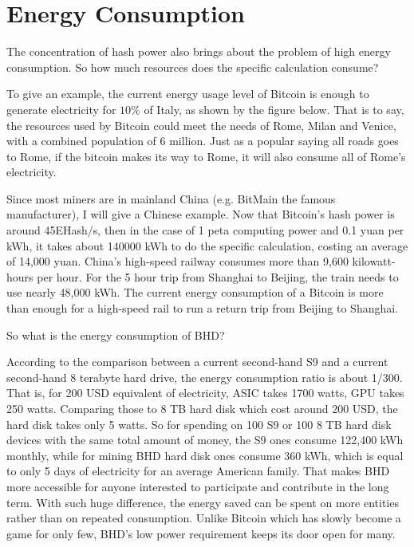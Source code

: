 \section{Energy Consumption}
\begin{flushleft}
    The concentration of hash power also brings about the problem of high energy consumption. So how much resources does the specific calculation consume?
\end{flushleft}
\begin{flushleft}
    To give an example, the current energy usage level of Bitcoin is enough to generate electricity for $10\%$ of Italy, as shown by the figure below. That is to say, the resources used by Bitcoin could meet the needs of Rome, Milan and Venice, with a combined population of 6 million. Just as a popular saying all roads goes to Rome, if the bitcoin makes its way to Rome, it will also consume all of Rome's electricity.
\end{flushleft}
\begin{flushleft}
    Since most miners are in mainland China (e.g. BitMain the famous manufacturer), I will give a Chinese example. Now that Bitcoin's hash power is around 45EHash/s, then in the case of 1 peta computing power and 0.1 yuan per kWh, it takes about 140000 kWh to do the specific calculation, costing an average of 14,000 yuan. China's high-speed railway consumes more than 9,600 kilowatt-hours per hour. For the 5 hour trip from Shanghai to Beijing, the train needs to use nearly 48,000 kWh. The current energy consumption of a Bitcoin is more than enough for a high-speed rail to run a return trip from Beijing to Shanghai.
\end{flushleft}
\begin{flushleft}
    So what is the energy consumption of BHD?
\end{flushleft}
\begin{flushleft}
    According to the comparison between a current second-hand S9 and a current second-hand 8 terabyte hard drive, the energy consumption ratio is about 1/300. That is, for 200 USD equivalent of electricity, ASIC takes 1700 watts, GPU takes 250 watts. Comparing those to 8 TB hard disk which cost around 200 USD, the hard disk takes only 5 watts. So for spending on 100 S9 or 100 8 TB hard disk devices with the same total amount of money, the S9 ones consume 122,400 kWh monthly, while for mining BHD hard disk ones consume 360 kWh, which is equal to only 5 days of electricity for an average American family. That makes BHD more accessible for anyone interested to participate and contribute in the long term. With such huge difference, the energy saved can be spent on more entities rather than on repeated consumption. Unlike Bitcoin which has slowly become a game for only few, BHD’s low power requirement keeps its door open for many.
\end{flushleft}
